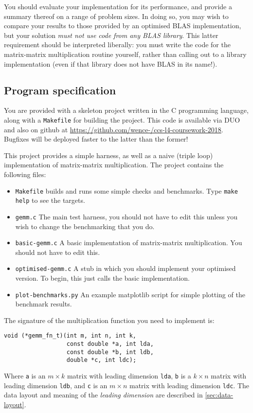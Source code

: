 \documentclass[a4paper]{article}
\begin{document}
You should evaluate your implementation for its performance, and
provide a summary thereof on a range of problem sizes.  In doing so,
you may wish to compare your results to those provided by an optimised
BLAS implementation, but your solution \emph{must not use code from
  any BLAS library}.  This latter requirement should be interpreted
liberally: you must write the code for the matrix-matrix
multiplication routine yourself, rather than calling out to a library
implementation (even if that library does not have BLAS in its name!).

\subsection{Program specification}
\label{sec:program-l4}
You are provided with a skeleton project written in the C programming
language, along with a \texttt{Makefile} for building the project.
This code is available via DUO and also on github at
\url{https://github.com/wence-/ccs-l4-coursework-2018}.  Bugfixes will
be deployed faster to the latter than the former!

This project provides a simple harness, as well as a naive (triple loop)
implementation of matrix-matrix multiplication.  The project contains
the following files:
\begin{itemize}
\item \texttt{Makefile} builds and runs some simple checks and
  benchmarks.  Type \texttt{make help} to see the targets.
\item \texttt{gemm.c} The main test harness, you should not have to
  edit this unless you wish to change the benchmarking that you do.
\item \texttt{basic-gemm.c} A basic implementation of matrix-matrix
  multiplication.  You should not have to edit this.
\item \texttt{optimised-gemm.c} A stub in which you should implement
  your optimised version.  To begin, this just calls the basic
  implementation.
\item \texttt{plot-benchmarks.py} An example matplotlib script for simple
  plotting of the benchmark results.
\end{itemize}

The signature of the multiplication function you need to implement is:
\begin{verbatim}
void (*gemm_fn_t)(int m, int n, int k,
                  const double *a, int lda,
                  const double *b, int ldb,
                  double *c, int ldc);
\end{verbatim}
Where \verb~a~ is an $m\times k$ matrix with leading dimension
\verb~lda~, \verb~b~ is a $k \times n$ matrix with leading dimension
\verb~ldb~, and \verb~c~ is an $m \times n$ matrix with leading
dimension \verb~ldc~.  The data layout and meaning of the
\emph{leading dimension} are described in \cref{sec:data-layout}.
\end{document}
